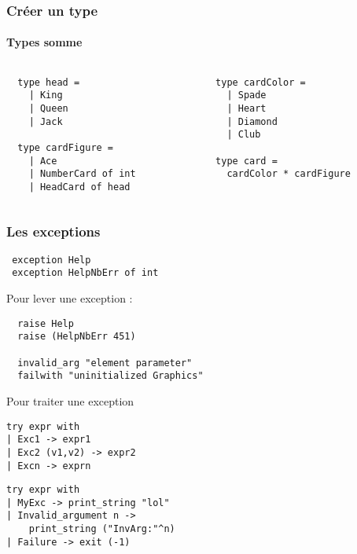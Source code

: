 \begin{frame}[fragile]
	\frametitle{Créer un type}
	\framesubtitle{Types somme}
	\begin{columns}
		\begin{column}{5cm}
			\begin{lstlisting}
  type head =
    | King
    | Queen
    | Jack

  type cardFigure =
    | Ace
    | NumberCard of int
    | HeadCard of head
			\end{lstlisting}
		\end{column}
		\begin{column}{7cm}
			\begin{lstlisting}
  type cardColor =
    | Spade
    | Heart
    | Diamond
    | Club
  
  type card = 
    cardColor * cardFigure
			\end{lstlisting}
		\end{column}
	\end{columns}
\end{frame}

\begin{frame}[fragile]
	\frametitle{Les exceptions}
	\begin{lstlisting}
 exception Help
 exception HelpNbErr of int
	\end{lstlisting}
	\begin{block}{Pour lever une exception :}
		\begin{lstlisting}
  raise Help
  raise (HelpNbErr 451)
  
  invalid_arg "element parameter"
  failwith "uninitialized Graphics"
		\end{lstlisting}
	\end{block}
	\begin{block}{Pour traiter une exception}
		\begin{center}
			\begin{minipage}{4.2cm}
				\lstset{basicstyle=\scriptsize}
				\begin{lstlisting}
try expr with 
| Exc1 -> expr1
| Exc2 (v1,v2) -> expr2
| Excn -> exprn
				\end{lstlisting}
			\end{minipage}
			\begin{minipage}{5cm}
				\lstset{basicstyle=\scriptsize}
				\begin{lstlisting}
try expr with 
| MyExc -> print_string "lol"
| Invalid_argument n -> 
    print_string ("InvArg:"^n)
| Failure -> exit (-1)
				\end{lstlisting}
			\end{minipage}
		\end{center}
	\end{block}
\end{frame}
